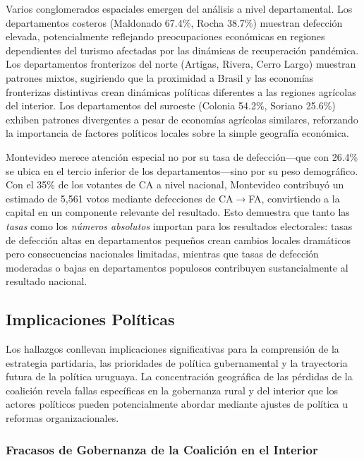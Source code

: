 Varios conglomerados espaciales emergen del análisis a nivel departamental. Los departamentos costeros (Maldonado 67.4\%, Rocha 38.7\%) muestran defección elevada, potencialmente reflejando preocupaciones económicas en regiones dependientes del turismo afectadas por las dinámicas de recuperación pandémica. Los departamentos fronterizos del norte (Artigas, Rivera, Cerro Largo) muestran patrones mixtos, sugiriendo que la proximidad a Brasil y las economías fronterizas distintivas crean dinámicas políticas diferentes a las regiones agrícolas del interior. Los departamentos del suroeste (Colonia 54.2\%, Soriano 25.6\%) exhiben patrones divergentes a pesar de economías agrícolas similares, reforzando la importancia de factores políticos locales sobre la simple geografía económica.

Montevideo merece atención especial no por su tasa de defección---que con 26.4\% se ubica en el tercio inferior de los departamentos---sino por su peso demográfico. Con el 35\% de los votantes de CA a nivel nacional, Montevideo contribuyó un estimado de 5,561 votos mediante defecciones de CA$\to$FA, convirtiendo a la capital en un componente relevante del resultado. Esto demuestra que tanto las \textit{tasas} como los \textit{números absolutos} importan para los resultados electorales: tasas de defección altas en departamentos pequeños crean cambios locales dramáticos pero consecuencias nacionales limitadas, mientras que tasas de defección moderadas o bajas en departamentos populosos contribuyen sustancialmente al resultado nacional.

\subsection{Implicaciones Políticas}
\label{sec:discusion_implicaciones}

Los hallazgos conllevan implicaciones significativas para la comprensión de la estrategia partidaria, las prioridades de política gubernamental y la trayectoria futura de la política uruguaya. La concentración geográfica de las pérdidas de la coalición revela fallas específicas en la gobernanza rural y del interior que los actores políticos pueden potencialmente abordar mediante ajustes de política u reformas organizacionales.

\subsubsection{Fracasos de Gobernanza de la Coalición en el Interior}

